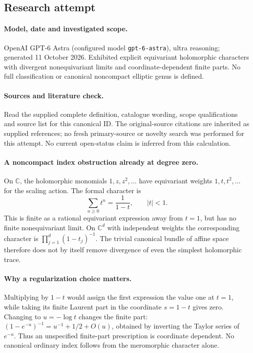 \documentclass[11pt]{article}
\begin{document}
\subsection{Research attempt}
\paragraph{Model, date and investigated scope.}
OpenAI GPT-6 Astra (configured model \texttt{gpt-6-astra}), ultra reasoning; generated 11 October 2026. Exhibited explicit equivariant holomorphic characters with divergent nonequivariant limits and coordinate-dependent finite parts. No full classification or canonical noncompact elliptic genus is defined.

\paragraph{Sources and literature check.}
Read the supplied complete definition, catalogue wording, scope qualifications and source list for this canonical ID. The original-source citations are inherited as supplied references; no fresh primary-source or novelty search was performed for this attempt. No current open-status claim is inferred from this calculation.

\paragraph{A noncompact index obstruction already at degree zero.}On \(\mathbb C\), the holomorphic monomials \(1,z,z^2,\ldots\) have equivariant weights \(1,t,t^2,\ldots\) for the scaling action. The formal character is
\[\sum_{n\ge0}t^n=\frac1{1-t},\qquad |t|<1.
\]
This is finite as a rational equivariant expression away from \(t=1\), but has no finite nonequivariant limit. On \(\mathbb C^d\) with independent weights the corresponding character is \(\prod_{j=1}^d(1-t_j)^{-1}\). The trivial canonical bundle of affine space therefore does not by itself remove divergence of even the simplest holomorphic trace.
\paragraph{Why a regularization choice matters.}Multiplying by \(1-t\) would assign the first expression the value one at \(t=1\), while taking its finite Laurent part in the coordinate \(s=1-t\) gives zero. Changing to \(u=-\log t\) changes the finite part: \((1-e^{-u})^{-1}=u^{-1}+1/2+O(u)\), obtained by inverting the Taylor series of \(e^{-u}\). Thus an unspecified finite-part prescription is coordinate dependent. No canonical ordinary index follows from the meromorphic character alone.
\end{document}
